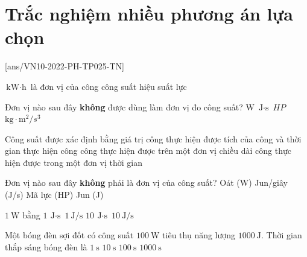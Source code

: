 \let\lesson\undefined
\newcommand{\lesson}{\phantomlesson{Bài 16.}}
\setcounter{section}{2}
\section{Trắc nghiệm nhiều phương án lựa chọn}
\setcounter{ex}{0}
[ans/VN10-2022-PH-TP025-TN]
\begin{ex}
	$\si{\kilo\watt\cdot\hour}$ là đơn vị của
	\choice
	{\True công}
	{công suất}
	{hiệu suất}
	{lực}
	\loigiai{}
\end{ex}
\begin{ex}
	Đơn vị nào sau đây \textbf{không} được dùng làm đơn vị đo công suất?
	\choice
	{$\si{\watt}$}
	{\True $\si{\joule\cdot\second}$}
	{$\si{HP}$}
	{$\si{\kilogram\cdot\meter^2/s^3}$}
	\loigiai{}
\end{ex}
\begin{ex}
	Công suất được xác định bằng
	\choice
	{giá trị công thực hiện được}
	{tích của công và thời gian thực hiện công}
	{công thực hiện được trên một đơn vị chiều dài}
	{\True công thực hiện được trong một đơn vị thời gian}
	\loigiai{}
\end{ex}
\begin{ex}
Đơn vị nào sau đây \textbf{không} phải là đơn vị của công suất?	
	\choice
	{Oát (W)}
	{Jun/giây (J/s)}
	{Mã lực (HP)}
	{\True Jun (J)}
	\loigiai{}
\end{ex}
\begin{ex}
	$\SI{1}{\watt}$ bằng
	\choice
	{$\SI{1}{\joule\cdot\second}$}
	{\True $\SI{1}{\joule/\second}$}
	{$\SI{10}{\joule\cdot\second}$}
	{$\SI{10}{\joule/\second}$}
	\loigiai{}
\end{ex}
\begin{ex}
	Một bóng đèn sợi đốt có công suất $\SI{100}{\watt}$ tiêu thụ năng lượng $\SI{1000}{\joule}$. Thời gian thắp sáng bóng đèn là
	\choice
	{$\SI{1}{\second}$}
	{\True $\SI{10}{\second}$}
	{$\SI{100}{\second}$}
	{$\SI{1000}{\second}$}
	\loigiai{}
\end{ex}
